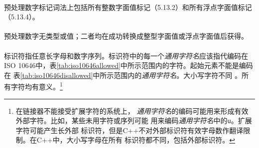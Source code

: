 \paragraph{}
预处理数字标记词法上包括所有整数字面值标记（5.13.2）和所有浮点字面值标记
（5.13.4）。

\paragraph{}
预处理数字无类型或值；二者均在成功转换成整型字面值或浮点字面值后获得。


\paragraph{}
标识符指任意长字母和数字序列。标识符中的每一个\textit{通用字符名}应该指代编码在
ISO 10646中，表\ref{tab:iso10646allowed}中所示范围内的字符。起始元素不能是编码在
表\ref{tab:iso10646disallowed}中所示范围内的\textit{通用字符名}。大小写字符不同
。所有字符均有意义。\footnote{在链接器不能接受扩展字符的系统上，
\textit{通用字符名}的编码可能用来形成有效外部字符。比如，某些未用字符或序列可能
用来编码\textit{通用字符名}中的\texttt{\bs u}。扩展字符可能产生长外部
标识符，但是C++不对外部标识符有效字母数作翻译限制。在C++中，大小写字母在所有
标识符都不同，包括外部标识符。}

